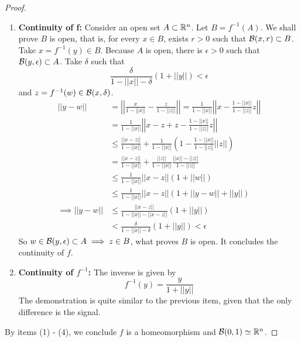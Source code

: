 \begin{proof}
\begin{enumerate}
    \item \textbf{Continuity of f:} Consider an open set $A \subset \mathbb{R}^n$. Let
    $B = f^{-1}(A)$. We shall prove $B$ is open, that is, for every $x \in B$,
    exists $r > 0$ such that $\mathcal{B}(x, r) \subset B$. Take $x = f^{-1}(y) \in B$.
    Because $A$ is open, there is $\epsilon > 0$ such that $\mathcal{B}(y, \epsilon)
    \subset A$. Take $\delta$ such that 
    $$
    \frac{\delta}{1 - ||x|| - \delta}(1 + ||y||) < \epsilon
    $$
    and $z = f^{-1}(w) \in \mathcal{B}(x,\delta)$. 
    \begin{equation*}
        \begin{split}
            ||y - w|| &= \left|\left|\frac{x}{1 - ||x||} - \frac{z}{1 - ||z||}\right|\right| = \frac{1}{1 - ||x||}\left|\left|x - \frac{1 - ||x||}{1 - ||z||}z\right|\right| \\ 
            &= \frac{1}{1 - ||x||}\left|\left|x - z + z - \frac{1 - ||x||}{1 - ||z||}z\right|\right| \\
            &\le \frac{||x-z||}{1 - ||x||} + \frac{1}{1 - ||x||}\left(1 - \frac{1 - ||x||}{1 - ||z||}||z||\right) \\
            &= \frac{||x-z||}{1 - ||x||} + \frac{||z||}{1 - ||x||}\frac{||x|| - ||z||}{1 - ||z||} \\
            &\le \frac{1}{1 - ||x||}||x-z||(1 + ||w||) \\
            &\le \frac{1}{1 - ||x||}||x-z||(1 + ||y - w|| + ||y||) \\
            \implies ||y - w|| &\le \frac{||x-z||}{1 - ||x|| - ||x-z||}(1 + ||y||) \\ 
            &< \frac{\delta}{1 - ||x|| - \delta}(1 + ||y||) < \epsilon
        \end{split}
    \end{equation*}
    So $w \in \mathcal{B}(y, \epsilon) \subset A \implies z \in B$, what proves $B$ is
    open. It concludes the continuity of $f$. 

    \item \textbf{Continuity of $f^{-1}$: } The inverse is given by 
    $$
    f^{-1}(y) = \frac{y}{1 + ||y||}
    $$
    The demonstration is quite similar to the previous item, given that the
    only difference is the signal. 
\end{enumerate}

By items (1) - (4), we conclude $f$ is a homeomorphism and $\mathcal{B}(0,1) \simeq
\mathbb{R}^n$.

\end{proof}

\noindent\linia

